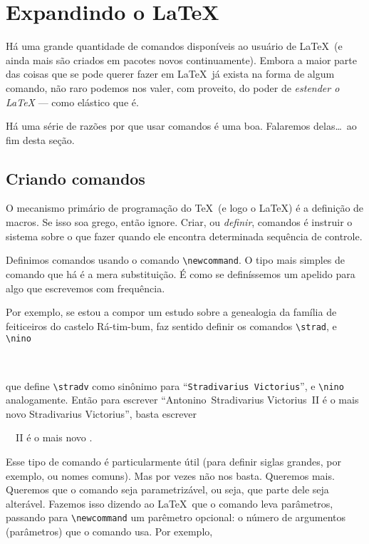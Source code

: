 \section{Expandindo o \LaTeX}

Há uma grande quantidade de comandos disponíveis ao usuário de
\LaTeX\ (e ainda mais são criados em pacotes novos
continuamente). Embora a maior parte das coisas que se pode querer
fazer em \LaTeX\ já exista na forma de algum comando, não raro podemos
nos valer, com proveito, do poder de \emph{estender o \LaTeX} ---
como elástico que é.
 
Há uma série de razões por que usar comandos é uma boa. Falaremos
delas\ldots\ ao fim desta seção.

\subsection{Criando comandos}\label{sec:comandos}

O mecanismo primário de programação do \TeX\ (e logo o \LaTeX) é a
definição de macros. Se isso soa grego, então ignore. Criar, ou
\emph{definir}, comandos é instruir o sistema sobre o que fazer quando
ele encontra determinada sequência de controle.

Definimos comandos usando o comando \verb'\newcommand'. O tipo mais
simples de comando que há é a mera substituição. É como se
definíssemos um apelido para algo que escrevemos com frequência.

Por exemplo, se estou a compor um estudo sobre a genealogia da família
de feiticeiros do castelo \mbox{Rá-tim-bum}, faz sentido definir os
comandos \verb'\strad', e \verb'\nino'
\newcommand{\stradv}{Stradivarius Victorius}
\newcommand{\nino}{Antonino}
\begin{ttsample}
  \\
\end{ttsample}
que define \verb'\stradv' como sinônimo para ``{\tt Stradivarius
  Victorius}'', e \verb'\nino' analogamente. Então para escrever
``\nino\ \stradv\ II é o mais novo \stradv'', basta escrever
\begin{ttsample}
\barra\ \barra\ II
 é o mais
  novo .
\end{ttsample}


Esse tipo de comando é particularmente útil (para definir siglas
grandes, por exemplo, ou nomes comuns). Mas por vezes não nos
basta. Queremos mais. Queremos que o comando seja parametrizável, ou
seja, que parte dele seja alterável. Fazemos isso dizendo ao
\LaTeX\ que o comando leva parâmetros, passando para
\verb'\newcommand' um parêmetro opcional: o número de argumentos
(parâmetros) que o comando usa. Por exemplo,
\begin{ttsample}
\end{ttsample}

